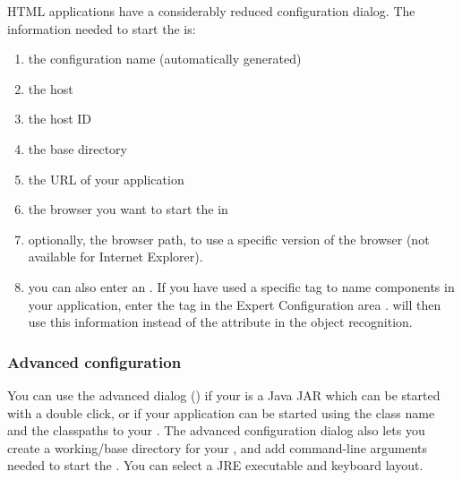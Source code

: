 HTML applications have a considerably reduced configuration dialog. The information needed to start the \gdaut{} is:
\begin{enumerate}
\item the \gdaut{} configuration name (automatically generated)
\item the \gdagent{} host
\item the \gdagent{} host\gdaut{} ID
\item the base directory
\item the URL of your application
\item the browser you want to start the \gdaut{} in
\item optionally, the browser path, to use a specific version of the browser (not available for Internet Explorer). 
\item you can also enter an . If you have used a specific tag to name components in your application, enter the tag in the Expert Configuration area . \app{} will then use this information instead of the  attribute in the object recognition. 
\end{enumerate}


\subsubsection{Advanced \gdaut{} configuration}
\label{AdvancedAUTConfig}

You can use the advanced dialog () if your \gdaut{} is a Java JAR which can be started with a double click, or if your application can be started using the class name and the classpaths to your \gdaut{}.  The advanced configuration dialog also lets you create a working/base directory for your \gdaut{}, and add command-line arguments needed to start the \gdaut{}. You can select a JRE executable and keyboard layout.

